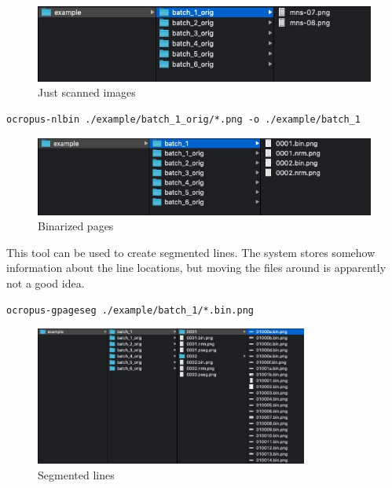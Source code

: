 \documentclass[]{book}
\begin{document}
\begin{figure}
\centering
\includegraphics{./images/ocropy_starting_point.jpg}
\caption{Just scanned images}
\end{figure}

\begin{verbatim}
ocropus-nlbin ./example/batch_1_orig/*.png -o ./example/batch_1
\end{verbatim}

\begin{figure}
\centering
\includegraphics{./images/ocropy_binarized_pages.jpg}
\caption{Binarized pages}
\end{figure}

This tool can be used to create segmented lines. The system stores somehow information about the line locations, but moving the files around is apparently not a good idea.

\begin{verbatim}
ocropus-gpageseg ./example/batch_1/*.bin.png
\end{verbatim}

\begin{figure}
\centering
\includegraphics[width=0.8\textwidth,height=\textheight]{./images/ocropy_segmented_lines.jpg}
\caption{Segmented lines}
\end{figure}
\end{document}
